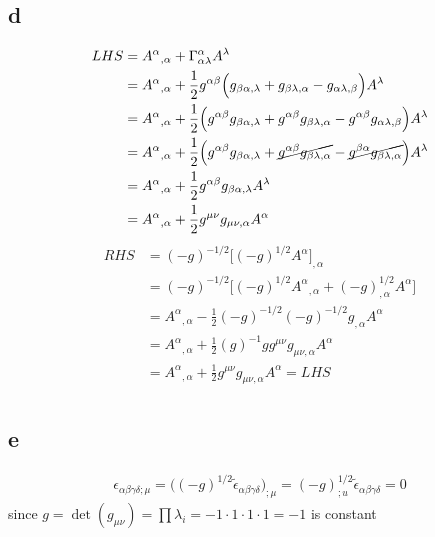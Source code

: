 \documentclass{article}
\begin{document}
\subsection*{d}
\begin{align*}
LHS &= A^\alpha{}_{,\alpha} + \Gamma^{\alpha}_{\alpha\lambda}A^\lambda \\
&= A^\alpha{}_{,\alpha} + \frac{1}{2}g^{\alpha\beta}\Big(g_{\beta\alpha,\lambda} + g_{\beta\lambda, \alpha} - g_{\alpha\lambda,\beta}\Big)A^\lambda \\
&= A^\alpha{}_{,\alpha} + \frac{1}{2}\Big(g^{\alpha\beta}g_{\beta\alpha,\lambda} + g^{\alpha\beta}g_{\beta\lambda, \alpha} -  g^{\alpha\beta}g_{\alpha\lambda,\beta}\Big)A^\lambda \\
&= A^\alpha{}_{,\alpha} + \frac{1}{2}\Big(g^{\alpha\beta}g_{\beta\alpha,\lambda} + \cancel{g^{\alpha\beta}g_{\beta\lambda, \alpha}} -  \cancel{g^{\beta\alpha}g_{\beta\lambda,\alpha}} \Big)A^\lambda  \\
&= A^\alpha{}_{,\alpha} + \frac{1}{2}g^{\alpha\beta}g_{\beta\alpha,\lambda}A^\lambda \\
&= A^\alpha{}_{,\alpha} + \frac{1}{2}g^{\mu\nu}g_{\mu\nu,\alpha}A^\alpha 
\end{align*}
\begin{align*}
RHS &= (-g)^{-1/2}\Big[(-g)^{1/2}A^\alpha\Big]_{,\alpha} \\
&= (-g)^{-1/2}\Big[(-g)^{1/2}A^\alpha{}_{,\alpha} + (-g)^{1/2}_{,\alpha}A^\alpha \Big] \\
& = A^\alpha{}_{,\alpha} - \frac{1}{2}(-g)^{-1/2} (-g)^{-1/2}g_{,\alpha}A^\alpha \\ 
& = A^\alpha{}_{,\alpha} + \frac{1}{2}(g)^{-1}gg^{\mu\nu}g_{\mu\nu,\alpha} A^\alpha \\ 
& = A^\alpha{}_{,\alpha} + \frac{1}{2}g^{\mu\nu}g_{\mu\nu,\alpha} A^\alpha = LHS \\ 
\end{align*}
\subsection*{e}
\begin{align*}
\epsilon_{\alpha\beta\gamma\delta;\mu} = \Big((-g)^{1/2}\tilde{\epsilon}_{\alpha\beta\gamma\delta}\Big)_{;\mu}
= (-g)^{1/2}_{;u}\tilde{\epsilon}_{\alpha\beta\gamma\delta} = 0
\end{align*}
since $g = \det(g_{\mu\nu}) = \prod \lambda_i = -1 \cdot 1 \cdot 1 \cdot 1 = -1$ is constant
\section{}
\end{document}
